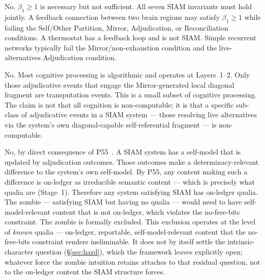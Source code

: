 \documentclass[11pt]{article}
\theoremstyle{remark}
\begin{document}
\begin{tcolorbox}[colback=gray!14,colframe=gray!55!black,
  title={Anticipated objections and their formal answers}]
\small
\begin{termlist}
  \item[``Every cortical circuit has feedback --- so every circuit is conscious?'']
    No. $\beta_1 \geq 1$ is necessary but not sufficient. All seven SIAM invariants
    must hold jointly. A feedback connection between two brain regions may satisfy
    $\beta_1 \geq 1$ while failing the Self/Other Partition, Mirror, Adjudication, or
    Reconciliation conditions. A thermostat has a feedback loop and is not SIAM.
    Simple recurrent networks typically fail the Mirror/non-exhaustion condition and
    the live-alternatives Adjudication condition.

  \item[``Most cognition is algorithmic --- does this contradict cognitive science?'']
    No. Most cognitive processing is algorithmic and operates at Layers~1--2. Only
    those adjudicative events that engage the Mirror-generated local diagonal fragment
    are transputation events. This is a small subset of cognitive processing. The claim
    is not that all cognition is non-computable; it is that a specific sub-class of
    adjudicative events in a SIAM system --- those resolving live alternatives via the
    system's own diagonal-capable self-referential fragment --- is non-computable.

  \item[``Couldn't a system satisfy all SIAM conditions with no inner life (zombie)?'']
    No, by direct consequence of P55~\cite{SpivackNEMS55}. A SIAM system has a
    self-model that is updated by adjudication outcomes. Those outcomes make a
    determinacy-relevant difference to the system's own self-model. By P55, any content
    making such a difference is on-ledger as irreducible semantic content --- which is
    precisely what qualia are (Stage~1). Therefore any system satisfying SIAM has
    on-ledger qualia. The zombie --- satisfying SIAM but having no qualia --- would need
    to have self-model-relevant content that is not on-ledger, which violates the
    no-free-bits constraint. The zombie is formally excluded. This exclusion operates
    at the level of \emph{known} qualia --- on-ledger, reportable, self-model-relevant
    content that the no-free-bits constraint renders ineliminable. It does not by itself
    settle the intrinsic-character question (\S\ref{sec:hard}), which the framework leaves
    explicitly open; whatever force the zombie intuition retains attaches to that residual
    question, not to the on-ledger content the SIAM structure forces.


\end{termlist}
\end{tcolorbox}
\end{document}
